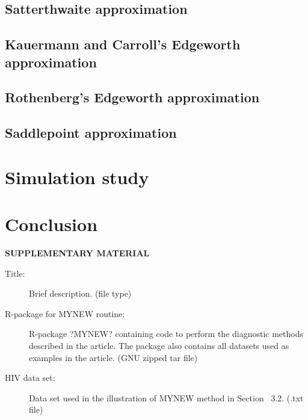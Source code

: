 \documentclass[12pt]{article}\usepackage[]{graphicx}\usepackage[]{color}
\begin{document}
\subsection{Satterthwaite approximation} 

\subsection{Kauermann and Carroll's Edgeworth approximation}

\subsection{Rothenberg's Edgeworth approximation}

\subsection{Saddlepoint approximation}


\section{Simulation study}
\label{sec:verify}

\section{Conclusion}
\label{sec:conc}


\newpage
\begin{center}
{\large\bf SUPPLEMENTARY MATERIAL}
\end{center}

\begin{description}

\item[Title:] Brief description. (file type)

\item[R-package for  MYNEW routine:] R-package ?MYNEW? containing code to perform the diagnostic methods described in the article. The package also contains all datasets used as examples in the article. (GNU zipped tar file)

\item[HIV data set:] Data set used in the illustration of MYNEW method in Section~ 3.2. (.txt file)

\end{description}



\end{document}
